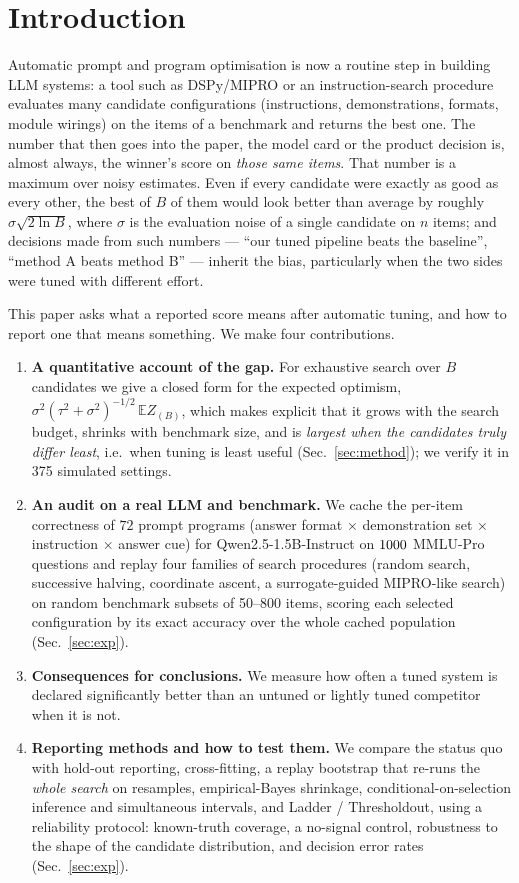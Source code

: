 \section{Introduction}
Automatic prompt and program optimisation is now a routine step in building LLM systems: a tool such as DSPy/MIPRO \citep{khattab2023dspy,opsahl2024optimizing} or an instruction-search procedure \citep{zhou2022large} evaluates many candidate configurations (instructions, demonstrations, formats, module wirings) on the items of a benchmark and returns the best one. The number that then goes into the paper, the model card or the product decision is, almost always, the winner's score on \emph{those same items}.
That number is a maximum over noisy estimates. Even if every candidate were exactly as good as every other, the best of $B$ of them would look better than average by roughly $\sigma\sqrt{2\ln B}$, where $\sigma$ is the evaluation noise of a single candidate on $n$ items; and decisions made from such numbers --- ``our tuned pipeline beats the baseline'', ``method A beats method B'' --- inherit the bias, particularly when the two sides were tuned with different effort.

This paper asks what a reported score means after automatic tuning, and how to report one that means something.
We make four contributions.
\begin{enumerate}\setlength\itemsep{0pt}
\item \textbf{A quantitative account of the gap.} For exhaustive search over $B$ candidates we give a closed form for the expected optimism, $\sigma^2(\tau^2+\sigma^2)^{-1/2}\,\mathbb{E}Z_{(B)}$, which makes explicit that it grows with the search budget, shrinks with benchmark size, and is \emph{largest when the candidates truly differ least}, i.e.\ when tuning is least useful (Sec.~\ref{sec:method}); we verify it in 375 simulated settings.
\item \textbf{An audit on a real LLM and benchmark.} We cache the per-item correctness of $72$ prompt programs (answer format $\times$ demonstration set $\times$ instruction $\times$ answer cue) for Qwen2.5-1.5B-Instruct on $1000$ MMLU-Pro questions and replay four families of search procedures (random search, successive halving, coordinate ascent, a surrogate-guided MIPRO-like search) on random benchmark subsets of 50--800 items, scoring each selected configuration by its exact accuracy over the whole cached population (Sec.~\ref{sec:exp}).
\item \textbf{Consequences for conclusions.} We measure how often a tuned system is declared significantly better than an untuned or lightly tuned competitor when it is not.
\item \textbf{Reporting methods and how to test them.} We compare the status quo with hold-out reporting, cross-fitting, a replay bootstrap that re-runs the \emph{whole search} on resamples, empirical-Bayes shrinkage, conditional-on-selection inference and simultaneous intervals, and Ladder / Thresholdout, using a reliability protocol: known-truth coverage, a no-signal control, robustness to the shape of the candidate distribution, and decision error rates (Sec.~\ref{sec:exp}).
\end{enumerate}
